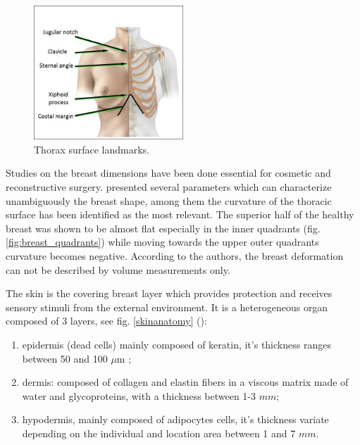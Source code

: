 \begin{center}
\begin{figure}[!h]
\centerline{\includegraphics[width=0.5\textwidth,height=0.5\textheight,keepaspectratio]{figures/surfacelandmarks.jpg} }
\caption{Thorax surface landmarks.}
\label{thorax}
\end{figure}
\end{center}

Studies on the breast dimensions have been done essential for cosmetic and reconstructive surgery. \cite{catanuto_experimental_2008} presented several parameters which can characterize unambiguously the breast shape, among them the curvature of the thoracic surface has been identified as the most relevant. The superior half of the healthy breast was shown to be
almost flat especially in the inner quadrants (fig. \ref{fig:breast_quadrants}) while moving towards the upper outer quadrants curvature becomes negative. According to the authors, the breast deformation can not be described by volume measurements only.

The skin is the covering breast layer which provides protection and receives sensory stimuli from the external environment. It is a heterogeneous organ composed of 3 layers, see fig. \ref{skinanatomy} (\cite{gefen_mechanics_2007}): 
\begin{enumerate}
\item epidermis (dead cells) mainly composed of keratin, it's thickness ranges between 50 and 100 $\mu$m ;
\item dermis: composed of collagen and elastin fibers in a viscous matrix made of water and glycoproteins, with a thickness between 1-3 $mm$;
\item hypodermis, mainly composed of adipocytes cells, it's thickness variate depending on the individual and location area between 1 and 7 $mm$.
\end{enumerate}


